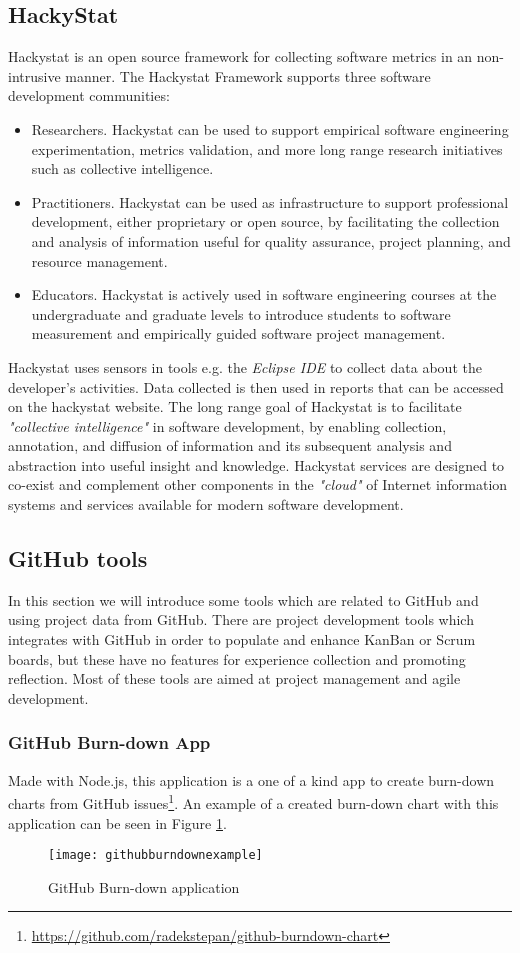 \subsection{HackyStat}
Hackystat is an open source framework for collecting software metrics in an non-intrusive manner. 
The Hackystat Framework supports three software development communities:
\begin{itemize}
	\item Researchers. Hackystat can be used to support empirical software engineering experimentation, metrics validation, and more long range research initiatives such as collective intelligence.
	\item Practitioners. Hackystat can be used as infrastructure to support professional development, either proprietary or open source, by facilitating the collection and analysis of information useful for quality assurance, project planning, and resource management.
	\item Educators. Hackystat is actively used in software engineering courses at the undergraduate and graduate levels to introduce students to software measurement and empirically guided software project management.
\end{itemize}
Hackystat uses sensors in tools e.g. the \emph{Eclipse IDE} to collect data about the developer's activities. Data collected is then used in reports that can be accessed on the hackystat website. 
The long range goal of Hackystat is to facilitate \emph{"collective intelligence"} in software development, by enabling collection, annotation, and diffusion of information and its subsequent analysis and abstraction into useful insight and knowledge. Hackystat services are designed to co-exist and complement other components in the \emph{"cloud"} of Internet information systems and services available for modern software development.\\ 

\subsection{GitHub tools}
\label{subsec:gittools}
In this section we will introduce some tools which are related to GitHub and using project data from GitHub. There are project development tools which integrates with GitHub in order to populate and enhance KanBan or Scrum boards, but these have no features for experience collection and promoting reflection. Most of these tools are aimed at project management and agile development. 
\subsubsection*{GitHub Burn-down App}
Made with Node.js, this application is a one of a kind app to create burn-down charts from GitHub issues\footnote{\url{https://github.com/radekstepan/github-burndown-chart}}. An example of a created burn-down chart with this application can be seen in Figure \ref{githubburndownexample}. 
\begin{figure}[H]
\centering
	\texttt{[image: githubburndownexample]}
\caption{GitHub Burn-down application}
\label{githubburndownexample}
\end{figure}

